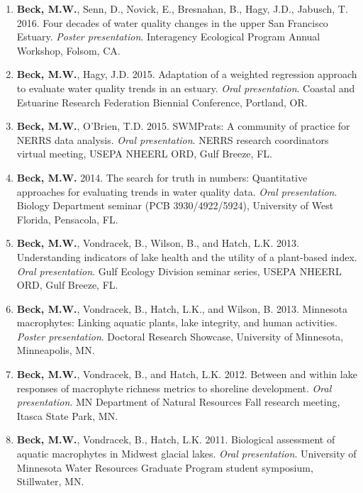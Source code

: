 \documentclass[letterpaper,12pt]{article}
\begin{document}
\begin{enumerate}

\item {\bf Beck, M.W.}, Senn, D., Novick, E., Bresnahan, B., Hagy, J.D., Jabusch, T. 2016. Four decades of water quality changes in the upper San Francisco Estuary. \textit{Poster presentation}. Interagency Ecological Program Annual Workshop, Folsom, CA.

\item {\bf Beck, M.W.}, Hagy, J.D. 2015. Adaptation of a weighted regression approach to evaluate water quality trends in an estuary. \textit{Oral presentation}. Coastal and Estuarine Research Federation Biennial Conference, Portland, OR.

\item {\bf Beck, M.W.}, O'Brien, T.D. 2015. SWMPrats: A community of practice for NERRS data analysis. \textit{Oral presentation}. NERRS research coordinators virtual meeting, USEPA NHEERL ORD, Gulf Breeze, FL.

\item {\bf Beck, M.W.} 2014. The search for truth in numbers: Quantitative approaches for evaluating trends in water quality data. \textit{Oral presentation}. Biology Department seminar (PCB 3930/4922/5924), University of West Florida, Pensacola, FL. 

\item {\bf Beck, M.W.}, Vondracek, B., Wilson, B., and Hatch, L.K. 2013. Understanding indicators of lake health and the utility of a plant-based index. \textit{Oral presentation}. Gulf Ecology Division seminar series, USEPA NHEERL ORD, Gulf Breeze, FL.

\item {\bf Beck, M.W.}, Vondracek, B., Hatch, L.K., and Wilson, B. 2013. Minnesota macrophytes: Linking aquatic plants, lake integrity, and human activities. \textit{Poster presentation}. Doctoral Research Showcase, University of Minnesota, Minneapolis, MN.

\item {\bf Beck, M.W.}, Vondracek, B., and Hatch, L.K. 2012. Between and within lake responses of macrophyte richness metrics to shoreline development. \textit{Oral presentation}. MN Department of Natural Resources Fall research meeting, Itasca State Park, MN.

\item {\bf Beck, M.W.}, Vondracek, B., Hatch, L.K. 2011. Biological assessment of aquatic macrophytes in Midwest glacial lakes. \textit{Oral presentation}. University of Minnesota Water Resources Graduate Program student symposium, Stillwater, MN.


\end{enumerate}
\end{document}

